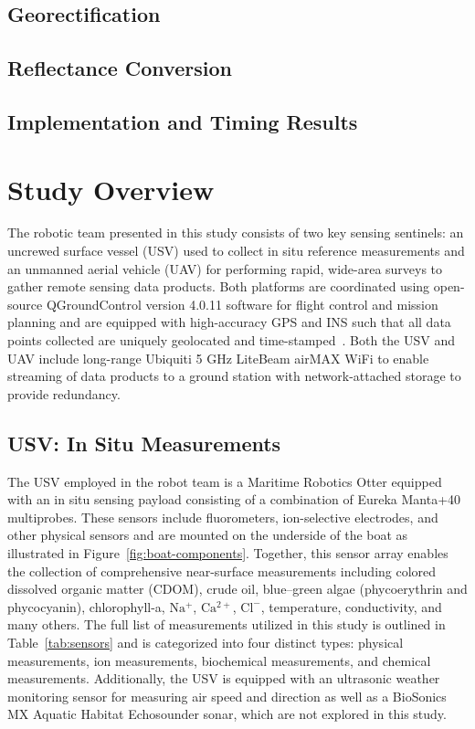 \subsection{Georectification}
\subsection{Reflectance Conversion}
\subsection{Implementation and Timing Results}



\section{Study Overview}

 The robotic team presented in this study consists of two key sensing sentinels: an uncrewed surface vessel (USV) used to collect in situ reference measurements and an unmanned aerial vehicle (UAV) for performing rapid, wide-area surveys to gather remote sensing data products. Both platforms are coordinated using open-source QGroundControl version 4.0.11 software for flight control and mission planning and are equipped with high-accuracy GPS and INS such that all data points collected are uniquely geolocated and time-stamped~\cite{qgroundcontrol}. Both the USV and UAV include long-range Ubiquiti 5 GHz LiteBeam airMAX WiFi to enable streaming of data products to a ground station with network-attached storage to provide redundancy.

\subsection{USV: In Situ Measurements}

The USV employed in the robot team is a Maritime Robotics Otter equipped with an in situ sensing payload consisting of a combination of Eureka Manta+40 multiprobes. These sensors include fluorometers, ion-selective electrodes, and other physical sensors and are mounted on the underside of the boat as illustrated in Figure~\ref{fig:boat-components}. Together, this sensor array enables the collection of comprehensive near-surface measurements including colored dissolved organic matter (CDOM), crude oil, blue--green algae (phycoerythrin and phycocyanin), chlorophyll-a, $\mathrm{Na^+}$, $\mathrm{Ca^{2+}}$, $\mathrm{Cl^-}$, temperature, conductivity, and many others. The full list of measurements utilized in this study is outlined in Table~\ref{tab:sensors} and is categorized into four distinct types: physical measurements, ion measurements, biochemical measurements, and chemical measurements. Additionally, the USV is equipped with an ultrasonic weather monitoring sensor for measuring air speed and direction as well as a BioSonics MX Aquatic Habitat Echosounder sonar, which are not explored in this study.

